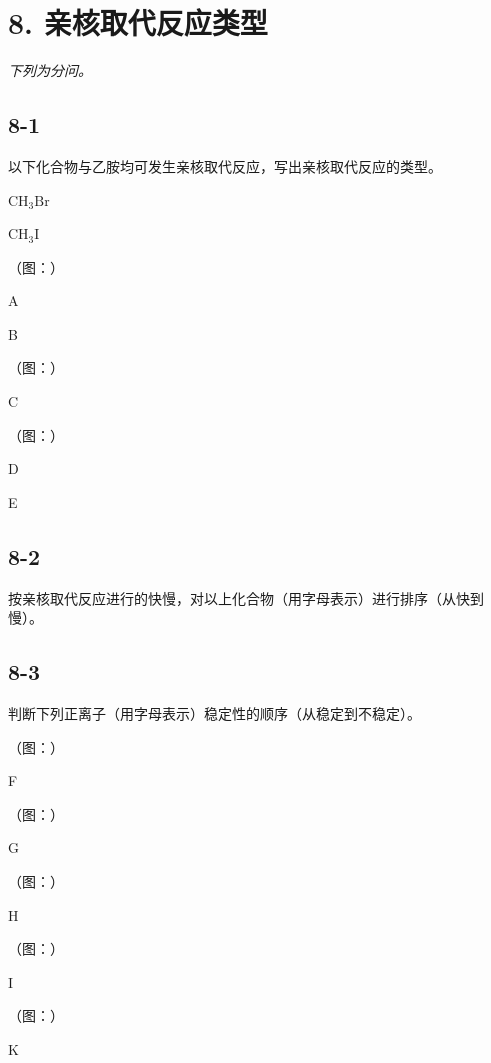 \section*{8. 亲核取代反应类型}
\textit{下列为分问。}

\subsection*{8-1}
以下化合物与⼄胺均可发⽣亲核取代反应，写出亲核取代反应的类型。

$
\mathrm{CH} _ {3} \mathrm{Br}
$

$
\mathrm{CH} _ {3} \mathrm{I}
$

（图：）

A

B

（图：）

C

（图：）

D

E

\subsection*{8-2}
按亲核取代反应进⾏的快慢，对以上化合物（⽤字⺟表⽰）进⾏排序（从快到慢）。

\subsection*{8-3}
判断下列正离⼦（⽤字⺟表⽰）稳定性的顺序（从稳定到不稳定）。

（图：）

F

（图：）

G

（图：）

H

（图：）

I

（图：）

K
